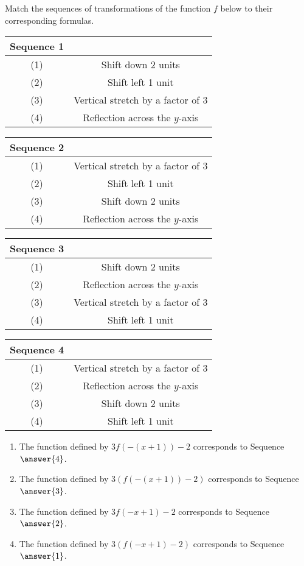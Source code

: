 \documentclass{ximera}
\author{Kenneth Berglund}
\begin{document}
\begin{exercise}
Match the sequences of transformations of the function $f$ below to their corresponding formulas.

\begin{tabular}{cc}
Sequence 1\\
\hline
(1) & Shift down 2 units \\
(2) & Shift left 1 unit \\
(3) & Vertical stretch by a factor of 3 \\
(4) & Reflection across the $y$-axis
\end{tabular}
\quad
\begin{tabular}{cc}
Sequence 2\\
\hline
(1) & Vertical stretch by a factor of 3 \\
(2) & Shift left 1 unit \\
(3) &  Shift down 2 units\\
(4) & Reflection across the $y$-axis
\end{tabular}
\quad
\begin{tabular}{cc}
Sequence 3\\
\hline
(1) & Shift down 2 units \\
(2) & Reflection across the $y$-axis \\
(3) & Vertical stretch by a factor of 3 \\
(4) & Shift left 1 unit
\end{tabular}
\quad
\begin{tabular}{cc}
Sequence 4\\
\hline
(1) & Vertical stretch by a factor of 3\\
(2) & Reflection across the $y$-axis \\
(3) & Shift down 2 units \\
(4) & Shift left 1 unit
\end{tabular}

\begin{enumerate}
\item The function defined by $3f(-(x + 1)) - 2$ corresponds to Sequence $\answer{4}$.
\item The function defined by $3(f(-(x + 1)) - 2)$ corresponds to Sequence $\answer{3}$.
\item The function defined by $3f(-x + 1) - 2$ corresponds to Sequence $\answer{2}$.
\item The function defined by $3(f(-x + 1) - 2)$ corresponds to Sequence $\answer{1}$.
\end{enumerate} 
\end{exercise}
\end{document}
